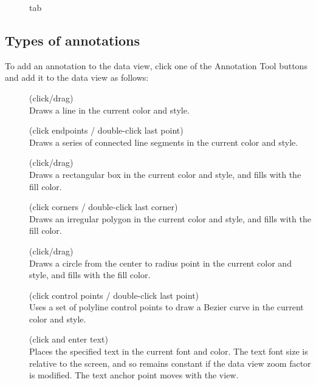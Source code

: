 \begin{figure}
  \begin{center}
    \caption[Annotations tab]{
        tab
    }
    \label{annotations_tab}
  \end{center}
\end{figure}

\subsection{Types of annotations}

To add an annotation to the data view, click one of the
{\gui Annotation Tool} buttons and add it to the data view as
follows:
\begin{description}

\item[] (click/drag) \\
Draws a line in the current color and style.

\item[] (click
endpoints / double-click last point) \\ Draws a series of
connected line segments in the current color and style.

\item[] (click/drag) \\
Draws a rectangular box in the current color and style, and fills
with the fill color.

\item[] (click
corners / double-click last corner) \\ Draws an irregular polygon
in the current color and style, and fills with the fill color.

\item[]
(click/drag) \\ Draws a circle from the center to radius point in
the current color and style, and fills with the fill color.

\item[] (click
control points / double-click last point) \\ Uses a set of
polyline control points to draw a Bezier curve in the current
color and style.

\item[] (click and enter text) \\ Places the
specified text in the current font and color. The text font size
is relative to the screen, and so remains constant if the data
view zoom factor is modified. The text anchor point moves with
the view.

\end{description}

